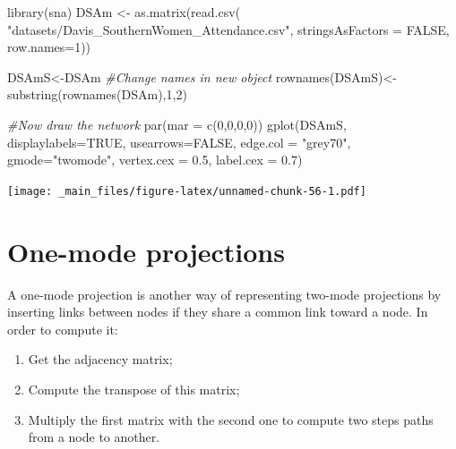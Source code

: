 \documentclass[
  notitlepage,
  onecolumn,
  openany]{book}
\newenvironment{Shaded}{\begin{snugshade}}{\end{snugshade}}
\newcommand{\AttributeTok}[1]{\textcolor[rgb]{0.77,0.63,0.00}{#1}}
\newcommand{\CommentTok}[1]{\textcolor[rgb]{0.56,0.35,0.01}{\textit{#1}}}
\newcommand{\ConstantTok}[1]{\textcolor[rgb]{0.00,0.00,0.00}{#1}}
\newcommand{\DecValTok}[1]{\textcolor[rgb]{0.00,0.00,0.81}{#1}}
\newcommand{\FloatTok}[1]{\textcolor[rgb]{0.00,0.00,0.81}{#1}}
\newcommand{\FunctionTok}[1]{\textcolor[rgb]{0.00,0.00,0.00}{#1}}
\newcommand{\NormalTok}[1]{#1}
\newcommand{\OtherTok}[1]{\textcolor[rgb]{0.56,0.35,0.01}{#1}}
\newcommand{\StringTok}[1]{\textcolor[rgb]{0.31,0.60,0.02}{#1}}
\providecommand{\tightlist}{%
  \setlength{\itemsep}{0pt}\setlength{\parskip}{0pt}}
\begin{document}
\begin{Shaded}
\begin{Highlighting}[]
\FunctionTok{library}\NormalTok{(sna)}
\NormalTok{DSAm }\OtherTok{\textless{}{-}} \FunctionTok{as.matrix}\NormalTok{(}\FunctionTok{read.csv}\NormalTok{(}
  \StringTok{"datasets/Davis\_SouthernWomen\_Attendance.csv"}\NormalTok{,}
  \AttributeTok{stringsAsFactors =} \ConstantTok{FALSE}\NormalTok{, }\AttributeTok{row.names=}\DecValTok{1}\NormalTok{))}

\NormalTok{DSAmS}\OtherTok{\textless{}{-}}\NormalTok{DSAm}
\CommentTok{\#Change names in new object}
\FunctionTok{rownames}\NormalTok{(DSAmS)}\OtherTok{\textless{}{-}}\FunctionTok{substring}\NormalTok{(}\FunctionTok{rownames}\NormalTok{(DSAm),}\DecValTok{1}\NormalTok{,}\DecValTok{2}\NormalTok{)}

\CommentTok{\#Now draw the network}
\FunctionTok{par}\NormalTok{(}\AttributeTok{mar =} \FunctionTok{c}\NormalTok{(}\DecValTok{0}\NormalTok{,}\DecValTok{0}\NormalTok{,}\DecValTok{0}\NormalTok{,}\DecValTok{0}\NormalTok{))}
\FunctionTok{gplot}\NormalTok{(DSAmS, }
      \AttributeTok{displaylabels=}\ConstantTok{TRUE}\NormalTok{, }
      \AttributeTok{usearrows=}\ConstantTok{FALSE}\NormalTok{, }
      \AttributeTok{edge.col =} \StringTok{"grey70"}\NormalTok{,}
      \AttributeTok{gmode=}\StringTok{"twomode"}\NormalTok{,}
      \AttributeTok{vertex.cex =} \FloatTok{0.5}\NormalTok{,}
      \AttributeTok{label.cex =} \FloatTok{0.7}\NormalTok{)}
\end{Highlighting}
\end{Shaded}

\texttt{[image: \_main\_files/figure-latex/unnamed-chunk-56-1.pdf]}

\hypertarget{one-mode-projections}{%
\section{One-mode projections}\label{one-mode-projections}}

A one-mode projection is another way of representing two-mode projections by inserting links between nodes if they share a common link toward a node. In order to compute it:

\begin{enumerate}
\def\labelenumi{\arabic{enumi}.}
\tightlist
\item
  Get the adjacency matrix;
\item
  Compute the transpose of this matrix;
\item
  Multiply the first matrix with the second one to compute two steps paths from a node to another.
\end{enumerate}
\end{document}
